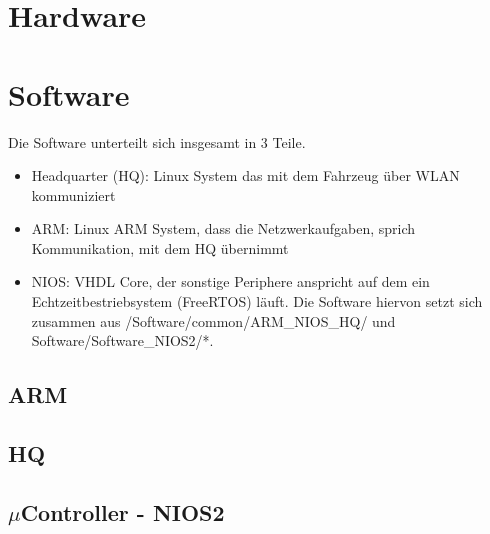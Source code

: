 \chapter{Hardware}

\chapter{Software}
Die Software unterteilt sich insgesamt in 3 Teile.
\begin{itemize}
 \item Headquarter (HQ): Linux System das mit dem Fahrzeug über WLAN kommuniziert
 \item ARM: Linux ARM System, dass die Netzwerkaufgaben, sprich Kommunikation, mit dem HQ übernimmt
 \item NIOS: VHDL Core, der sonstige Periphere anspricht auf dem ein Echtzeitbestriebsystem (FreeRTOS) läuft. Die Software hiervon setzt sich zusammen aus /Software/common/ARM\_NIOS\_HQ/ und Software/Software\_NIOS2/*.
\end{itemize}

\section{ARM}


\section{HQ}


\section{$\mu$Controller - NIOS2}




